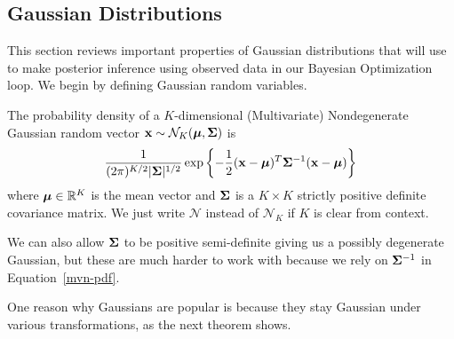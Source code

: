 \subsection{Gaussian Distributions}

This section reviews important properties of Gaussian distributions that will use to make posterior inference using observed data in our Bayesian Optimization loop.
We begin by defining Gaussian random variables.

\begin{definition}
    The probability density of a $K$-dimensional (Multivariate) Nondegenerate Gaussian random vector $\mathbf{x} \sim \mathcal{N}_K(\boldsymbol{\mu}, \boldsymbol{\Sigma})$
    is
    \begin{equation}
        \label{mvn-pdf}
        \frac{ 1 }{ (2 \pi)^{K/2} \lvert \boldsymbol{\Sigma} \rvert^{1/2} } \exp \left\{ -\frac12 (\mathbf{x} - \boldsymbol{\mu})^{T} \boldsymbol{\Sigma}^{-1} (\mathbf{x} - \boldsymbol{\mu})  \right\}
    \end{equation}
    where $\boldsymbol{\mu} \in \mathbb{R}^{K}$ is the mean vector and $\boldsymbol{\Sigma}$ is a $K \times K$ strictly positive definite covariance matrix.
    We just write $\mathcal{N}$ instead of $\mathcal{N}_K$ if $K$ is clear from context.
\end{definition}

We can also allow $\boldsymbol{\Sigma}$ to be positive semi-definite giving us a possibly degenerate Gaussian,
but these are much harder to work with because we rely on $\boldsymbol{\Sigma}^{-1}$ in Equation~\ref{mvn-pdf}.

One reason why Gaussians are popular is because they stay Gaussian under various transformations, as the next theorem shows.

